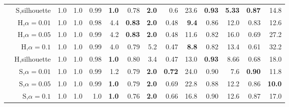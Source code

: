 \begin{table*}
\begin{center}
{\begin{tabular}[th]{@{}lrrrrrrrrrrrrr@{}}
                                                                                    & S,silhouette      & 1.0  & 1.0        & 0.99 & \textbf{1.0}        & 0.78 & \textbf{2.0}          & 0.6 & 23.6                 & \textbf{0.93} & \textbf{5.33}       & \textbf{0.87} & 14.8 \\

                                                                                    & H,$\alpha=0.01$   & 1.0  & 1.0        & 0.98 & 4.4                 & \textbf{0.83} & \textbf{2.0} & 0.48 & \textbf{9.4}        & 0.86 & 12.0       & 0.83 & 12.6  \\

                                                                                    & H,$\alpha=0.05$   & 1.0  & 1.0        & 0.99 & 4.2                 & \textbf{0.83} & \textbf{2.0} & 0.48 & 11.6                & 0.82 & 16.0       & 0.69 & 27.2 \\

                                                                                    & H,$\alpha=0.1$    & 1.0  & 1.0        & 0.99 & 4.0                 & 0.79 & 5.2                   & 0.47 & \textbf{8.8}        & 0.82 & 13.4       & 0.61 & 32.2 \\

                                                                                    & H,silhouette      & 1.0  & 1.0        & 0.98 & \textbf{1.0}        & 0.80 & 3.4                   & 0.47 & 13.0                & \textbf{0.93} & 8.66       & 0.68 & 18.0 \\
                \midrule
   \parbox[t]{2mm}{} & S,$\alpha=0.01$   & 1.0  & 1.0        & 0.99 & 1.2                 & 0.79 & \textbf{2.0}          & \textbf{0.72} & 24.0       & 0.90 & 7.6        & \textbf{0.90} & 11.8 \\

                                                                                    & S,$\alpha=0.05$   & 1.0  & 1.0        & 0.99 & \textbf{1.0}        & 0.79 & \textbf{2.0}          & 0.69 & 22.8                & 0.88 & 12.2       & 0.86 & \textbf{10.0} \\

                                                                                    & S,$\alpha=0.1$    & 1.0  & 1.0        & 1.0 & \textbf{1.0}         & 0.76 & \textbf{2.0}          & 0.66 & 16.8                & 0.90 & 12.6       & 0.87 & 17.0 \\


\end{tabular}}
\end{center}
\end{table*}
